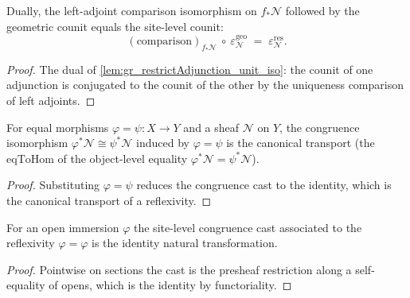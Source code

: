 \begin{lemma}\leanok
  \label{lem:gr_restrictIsoPullback_counit}
  Dually, the left-adjoint comparison isomorphism on \(f_{*}\mathcal{N}\) followed by
  the geometric counit equals the site-level counit:
  \[
    (\text{comparison})_{f_{*}\mathcal{N}}\ \circ\ \varepsilon^{\mathrm{geo}}_{\mathcal{N}}
      \;=\; \varepsilon^{\mathrm{res}}_{\mathcal{N}}.
  \]
\end{lemma}
\begin{proof}
  \leanok
  The dual of \cref{lem:gr_restrictAdjunction_unit_iso}: the counit of one adjunction
  is conjugated to the counit of the other by the uniqueness comparison of left
  adjoints.
\end{proof}

\begin{lemma}\leanok
  \label{lem:gr_pullbackCongr_hom_eqToHom}
  For equal morphisms \(\varphi = \psi : X \to Y\) and a sheaf \(\mathcal{N}\) on \(Y\),
  the congruence isomorphism \(\varphi^{*}\mathcal{N} \cong \psi^{*}\mathcal{N}\)
  induced by \(\varphi = \psi\) is the canonical transport (the \(\mathrm{eqToHom}\) of
  the object-level equality \(\varphi^{*}\mathcal{N} = \psi^{*}\mathcal{N}\)).
\end{lemma}
\begin{proof}

\leanok
  Substituting \(\varphi = \psi\) reduces the congruence cast to the identity, which is
  the canonical transport of a reflexivity.
\end{proof}

\begin{lemma}\leanok
  \label{lem:gr_restrictFunctorCongr_rfl}
  For an open immersion \(\varphi\) the site-level congruence cast associated to the
  reflexivity \(\varphi = \varphi\) is the identity natural transformation.
\end{lemma}
\begin{proof}

\leanok
  Pointwise on sections the cast is the presheaf restriction along a self-equality of
  opens, which is the identity by functoriality.
\end{proof}

